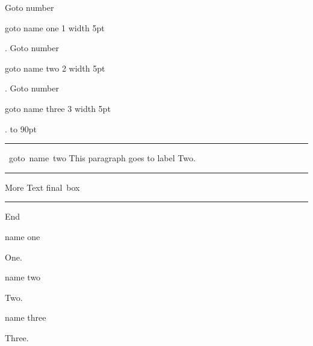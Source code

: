 
\newif\ifhint

\ifx\HINTversion\undefined
  \hintfalse
\else 
  \hinttrue
\fi



\def\txtlink#1#2{%
\ifhint
\HINTstartlink goto name {#1} \hbox{\rm #2} \HINTendlink\kern 5pt \vrule width 5pt
\else
\pdfstartlink goto name {#1} \hbox{\rm #2}\pdfendlink
\fi
}

\def\txttarget#1{%
\ifhint\HINTdest name {#1}\relax
\else
\pdfdest name {#1} fit
\fi
}

Goto number \txtlink{one}{1}.
Goto number \txtlink{two}{2}.
Goto number \txtlink{three}{3}.
\vbox to 90pt {
\hrule
\vfill
\hbox{
\ifhint\HINTstartlink\else\pdfstartlink\fi goto name {two}}
\vfill
This paragraph goes to label Two.
\vfill
\hrule
\vfill
More Text
\hbox{final box \ifhint\HINTendlink\else\pdfendlink\fi}
\vfill
\hrule
\vfill
End
}


\vfill\break
\txttarget{one}One.

\vfill\break
\txttarget{two}Two.

\vfill\break
\txttarget{three}Three.


\bye


